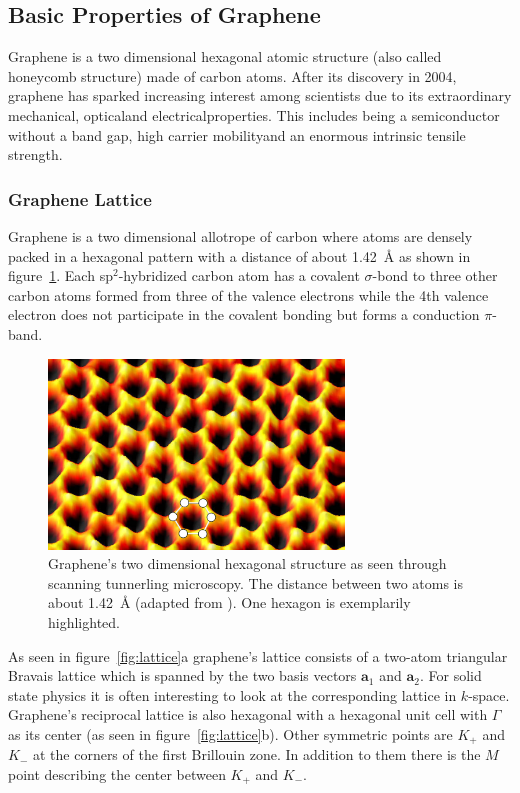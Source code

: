 \subsection{Basic Properties of Graphene}

Graphene is a two dimensional hexagonal atomic structure (also called honeycomb structure) made of carbon atoms. After its discovery in 2004\cite{novoselov}, graphene has sparked increasing interest among scientists due to its extraordinary mechanical\mcite, optical\mcite and electrical\mcite properties. This includes being a semiconductor without a band gap\mcite, high carrier mobility\mcite and an enormous intrinsic tensile strength\mcite.

\subsubsection{Graphene Lattice}

Graphene is a two dimensional allotrope of carbon where atoms are densely packed in a hexagonal pattern with a distance of about \SI{1.42}{\angstrom} as shown in figure~\ref{fig:spm}. Each sp$^2$-hybridized carbon atom has a covalent $\sigma$-bond to three other carbon atoms formed from three of the valence electrons while the 4th valence electron does not participate in the covalent bonding but forms a conduction $\pi$-band.

\begin{figure}[!h]
  \centering
  \includegraphics[width=0.7\textwidth]{./images/graphene-spm.png}
  \caption{Graphene's two dimensional hexagonal structure as seen through scanning tunnerling microscopy. The distance between two atoms is about \SI{1.42}{\angstrom} (adapted from \mcite). One hexagon is exemplarily highlighted.}
  \label{fig:spm}
\end{figure}

As seen in figure~\ref{fig:lattice}a graphene's lattice consists of a two-atom triangular Bravais lattice which is spanned by the two basis vectors $\mathbf{a}_1$ and $\mathbf{a}_2$. For solid state physics it is often interesting to look at the corresponding lattice in $k$-space. Graphene's reciprocal lattice is also hexagonal with a hexagonal unit cell with $\Gamma$ as its center (as seen in figure~\ref{fig:lattice}b). Other symmetric points are $K_+$ and $K_-$ at the corners of the first Brillouin zone. In addition to them there is the $M$ point describing the center between $K_+$ and $K_-$.

